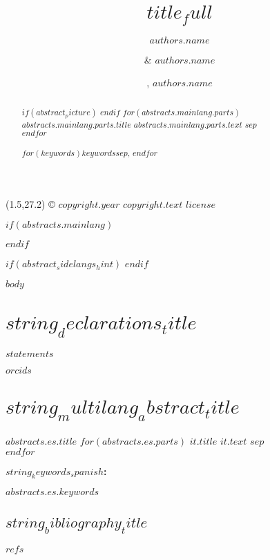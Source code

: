 \documentclass[twoside]{jchs}
\title{$title_full$}
\author[$authors.affiliation_ids$$if(authors.corresponding)$*$endif$]{$authors.name$}
\author[$authors.affiliation_ids$$if(authors.corresponding)$*$endif$]{\& $authors.name$}
\author[$authors.affiliation_ids$$if(authors.corresponding)$*$endif$]{, $authors.name$}
\affil[$affiliations.id$]{$affiliations.address$}
\begin{document}
\thispagestyle{empty}
\enlargethispage{-2\baselineskip}
\begin{textblock}{18}(1.5,27.2)
\footnotesize{\noindent © $copyright.year$ $copyright.text$ $license$}
\end{textblock}




$if(abstracts.mainlang)$
\begin{abstract}
$if(abstract_picture)$
\emergencystretch 1pt
$endif$
$for(abstracts.mainlang.parts)$
{\bfseries $abstracts.mainlang.parts.title$} $abstracts.mainlang.parts.text$ $sep$\\ 	
$endfor$\\
\\
\noindent
{\fontsize{10}{12}\selectfont{} 
$for(keywords)$$keywords$$sep$, $endfor$}
\end{abstract}
$endif$
	
	
$if(abstract_sidelangs_hint)$
\newcommand{\abstracthint}{$abstract_sidelangs_hint$}
$endif$
	
\maketitle\thispagestyle{empty} %
	
	
	
	
\begin{multicols}{2}
  \raggedcolumns
	$body$
	\section{$string_declarations_title$}
	{$statements$}
	
	
	{$orcids$}
\end{multicols}

\section{$string_multilang_abstract_title$}
\vspace{2mm}
\begin{tcolorbox}[colframe=themecolor2, colback=themecolor2, sharp corners,boxsep=4mm,top=3.5mm,left=3.8mm,right=2.0mm]\sffamily
	{\bfseries $abstracts.es.title$ } 
	\vskip 1mm
	$for(abstracts.es.parts)$
        	{\bfseries $it.title$} $it.text$ $sep$\\ 
     $endfor$
\vskip 3mm{\raggedright\bfseries $string_keywords_spanish$: }  $abstracts.es.keywords$ 
\end{tcolorbox}
\vspace{3mm}

\begin{multicols}{2}
	\raggedcolumns
	\section{$string_bibliography_title$}	
\raggedcolumns
	$refs$
\end{multicols}
\end{document}
